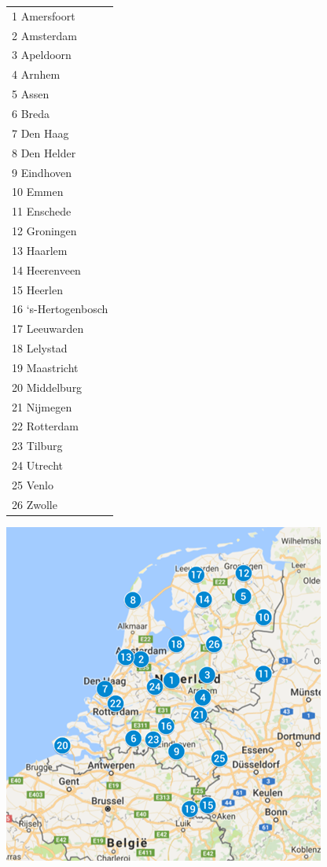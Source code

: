 \begin{table}[ht]
\begin{minipage}[L]{0.2\linewidth}
	\centering
	\begin{tabular}{l}
		1 Amersfoort\\ 
		2 Amsterdam\\
		3 Apeldoorn\\
		4 Arnhem\\
		5 Assen\\
		6 Breda\\
		7 Den Haag\\
		8 Den Helder\\
		9 Eindhoven\\
		10 Emmen\\
		11 Enschede\\
		12 Groningen\\
		13 Haarlem\\
		14 Heerenveen\\
		15 Heerlen\\
		16 ‘s-Hertogenbosch\\
		17 Leeuwarden\\
		18 Lelystad\\
		19 Maastricht\\
		20 Middelburg\\
		21 Nijmegen\\
		22 Rotterdam\\
		23 Tilburg\\
		24 Utrecht\\
		25 Venlo\\
		26 Zwolle
	\end{tabular}
	\label{26cities}
	
\end{minipage}
\hfill
	\begin{minipage}[R]{0.8\linewidth} 
		\centering
			\includegraphics[width=0.8\linewidth, right]{26cities}
		\label{map1}
	\end{minipage}
\end{table}

